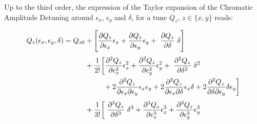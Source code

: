 \newpage
Up to the third order, the expression of the Taylor expansion of the Chromatic Amplitude Detuning
around $\epsilon_x$, $\epsilon_y$ and $\delta$, for a tune $Q_z$, $z \in \{x, y\}$ reads:

\begin{equation}
\begin{aligned}
Q_z(\epsilon_x, \epsilon_y, \delta) = Q_{z0} &+ \left[\frac{\partial Q_z}{\partial \epsilon_x} \epsilon_x
                                                 + \frac{\partial Q_z}{\partial \epsilon_y} \epsilon_y
                                                 + \colorbox{yellow!0}{$\displaystyle \frac{\partial Q_z}{\partial \delta}$} \delta
                                                \right] \\
                                             &+ \frac{1}{2!} \biggl[\frac{\partial^2Q_z}{\partial \epsilon_x^2}\epsilon_x^2 
                                                 + \frac{\partial^2Q_z}{\partial \epsilon_y^2}\epsilon_y^2
                                                 + \colorbox{yellow!0}{$\displaystyle \frac{\partial^2 Q_z}{\partial \delta^2}$} \delta^2  \\
                                             &\;\begin{aligned}
                                             \phantom{+ \frac{1}{2!} \biggl[}
                                               &+ 2 \frac{\partial^2Q_z}{\partial \epsilon_x \partial \epsilon_y}\epsilon_x \epsilon_y
                                                  + 2 \frac{\partial^2Q_z}{\partial \epsilon_x \partial \delta}\epsilon_x \delta
                                                  + 2 \frac{\partial^2Q_z}{\partial \delta \partial \epsilon_y} \delta \epsilon_y
                                             \biggr] \\
                                             \end{aligned} \\
                                             &+ \frac{1}{3!}
                                             \biggl[
                                                  \colorbox{yellow!0}{$\displaystyle \frac{\partial^3 Q_z}{\partial \delta^3}$}\delta^{3}
                                                  + \frac{\partial^{3} Q_z}{\partial \epsilon_{x}^{3}}  \epsilon_{x}^{3} 
                                                  + \frac{\partial^{3} Q_z}{\partial \epsilon_{y}^{3}}  \epsilon_{y}^{3} \\
                                             &\;\begin{aligned}

\end{aligned}
\end{aligned}
\end{equation}
